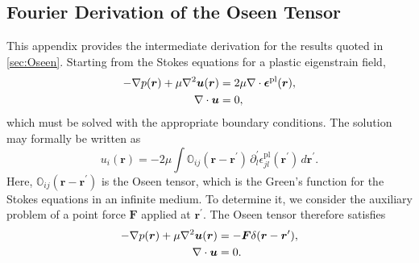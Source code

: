 \documentclass[asymmetricmargins]{library/duthesis}%
\newcommand{\DiffReportBodyFont}{\small}
\newenvironment{DiffReportContent}
  {\begingroup\DiffReportBodyFont}
  {\par\endgroup\medskip}
\begin{document}
\begin{DiffReportContent}
\begin{subappendices}
\section{Fourier Derivation of the Oseen Tensor}
\relax

This appendix provides the intermediate derivation for the results quoted in \cref{sec:Oseen}. Starting from the Stokes equations for a plastic eigenstrain field,
\begin{subequations}
\relax
\begin{align}
- \nabla p(\bm{r}) + \mu \nabla^2 \bm{u}(\bm{r}) &= 2\mu \nabla \cdot \bm{\epsilon}^{\mathrm{pl}}(\bm{r}), \\
\nabla \cdot \bm{u} &= 0,
\end{align}
\end{subequations}
which must be solved with the appropriate boundary conditions. The solution may formally be written as
\begin{equation}
    u_i(\bm{r}) = -2\mu \int \mathbb{O}_{ij}(\bm{r}-\bm{r}^\prime)\,\partial_l^\prime \epsilon_{jl}^{\mathrm{pl}}(\bm{r}^\prime)\, d\bm{r}^\prime.
\end{equation}
Here, $\mathbb{O}_{ij}(\bm{r}-\bm{r}^\prime)$ is the Oseen tensor, which is the Green's function for the Stokes equations in an infinite medium. To determine it, we consider the auxiliary problem of a point force $\bm{F}$ applied at $\bm{r}^\prime$. The Oseen tensor therefore satisfies
\begin{subequations}
\relax
\begin{align}
- \nabla p(\bm{r}) + \mu \nabla^2 \bm{u}(\bm{r}) &= -\bm{F} \delta(\bm{r} - \bm{r}^\prime), \relax \\
\nabla \cdot \bm{u} &= 0. \relax
\end{align}
\end{subequations}


\end{subappendices}
\end{DiffReportContent}
\end{document}
